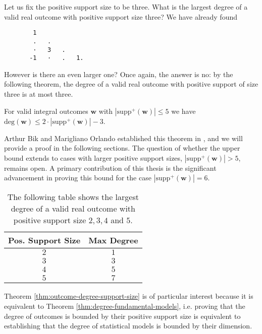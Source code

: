 \begin{example}
    Let us fix the positive support size to be three. What is the largest degree of a valid real outcome with positive support size three? We have already found
    \begin{verbatim}
        1  
        .   .     
        ·   3   .    
       -1   ·   .   1.   
    \end{verbatim} 
    However is there an even larger one? Once again, the answer is no: by the following theorem, the degree of a valid real outcome with positive support of size three is at most three.
 \end{example}

\begin{theorem}\label{thm:outcome-degree-support-size}
    For valid integral outcomes \( \mathbf w \) with \( |\mathrm{supp}^+(\mathbf w)| \leq 5 \) we have \( \mathrm{deg}(\mathbf w) \leq 2 \cdot |\mathrm{supp}^+(\mathbf w)| - 3 \).
\end{theorem}

Arthur Bik and Marigliano Orlando established this theorem in \cite{bik2022classifying}, and we will provide a proof in the following sections. The question of whether the upper bound extends to cases with larger positive support sizes, \( |\mathrm{supp}^+(\mathbf w)| > 5 \), remains open. A primary contribution of this thesis is the significant advancement in proving this bound for the case \( |\mathrm{supp}^+(\mathbf w)| = 6 \).

\begin{table}[h!] 
    \centering
    \begin{tabular}{|c|c|}
        \hline
        \textbf{Pos. Support Size} & \textbf{Max Degree} \\
        \hline
        \(2\) & \(1\) \\
        \(3\) & \(3\) \\
        \(4\) & \(5\) \\
        \(5\) & \(7\) \\
        \hline
    \end{tabular}
    \caption{    The following table shows the largest degree of a valid real outcome with positive support size \( 2,3,4 \) and \( 5 \).}
    \label{tab:support_size_degree}
\end{table}

Theorem \ref{thm:outcome-degree-support-size} is of particular interest because it is equivalent to Theorem \ref{thm:degree-fundamental-models}, i.e. proving that the degree of outcomes is bounded by their positive support size is equivalent to establishing that the degree of statistical models is bounded by their dimension.

